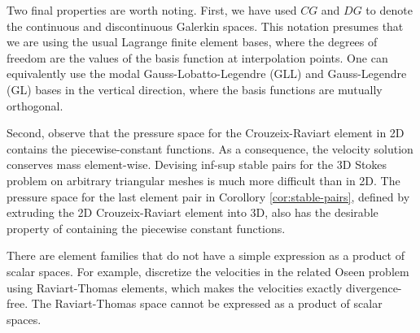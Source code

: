 \documentclass{article}
\theoremstyle{definition}
\theoremstyle{plain}
\begin{document}
Two final properties are worth noting.
First, we have used $CG$ and $DG$ to denote the continuous and discontinuous Galerkin spaces.
This notation presumes that we are using the usual Lagrange finite element bases, where the degrees of freedom are the values of the basis function at interpolation points.
One can equivalently use the modal Gauss-Lobatto-Legendre (GLL) and Gauss-Legendre (GL) bases in the vertical direction, where the basis functions are mutually orthogonal.

Second, observe that the pressure space for the Crouzeix-Raviart element in 2D contains the piecewise-constant functions.
As a consequence, the velocity solution conserves mass element-wise.
Devising inf-sup stable pairs for the 3D Stokes problem on arbitrary triangular meshes is much more difficult than in 2D.
The pressure space for the last element pair in Corollory \ref{cor:stable-pairs}, defined by extruding the 2D Crouzeix-Raviart element into 3D, also has the desirable property of containing the piecewise constant functions.

There are element families that do not have a simple expression as a product of scalar spaces.
For example, \citet{cockburn2007note} discretize the velocities in the related Oseen problem using Raviart-Thomas elements, which makes the velocities exactly divergence-free.
The Raviart-Thomas space cannot be expressed as a product of scalar spaces.


\pagebreak



\end{document}
